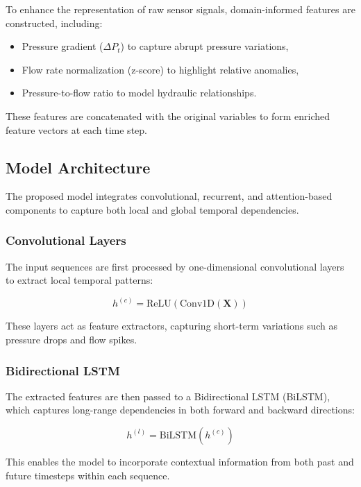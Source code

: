 To enhance the representation of raw sensor signals, domain-informed features
are constructed, including:

\begin{itemize}
    \item Pressure gradient ($\Delta P_t$) to capture abrupt pressure variations,
    \item Flow rate normalization (z-score) to highlight relative anomalies,
    \item Pressure-to-flow ratio to model hydraulic relationships.
\end{itemize}

These features are concatenated with the original variables to form enriched
feature vectors at each time step.

\subsection{Model Architecture}

The proposed model integrates convolutional, recurrent, and attention-based
components to capture both local and global temporal dependencies.

\subsubsection{Convolutional Layers}

The input sequences are first processed by one-dimensional convolutional layers
to extract local temporal patterns:

\begin{equation}
h^{(c)} = \text{ReLU}(\text{Conv1D}(\mathbf{X}))
\end{equation}

These layers act as feature extractors, capturing short-term variations such as
pressure drops and flow spikes.

\subsubsection{Bidirectional LSTM}

The extracted features are then passed to a Bidirectional LSTM (BiLSTM), which
captures long-range dependencies in both forward and backward directions:

\begin{equation}
h^{(l)} = \text{BiLSTM}(h^{(c)})
\end{equation}

This enables the model to incorporate contextual information from both past and
future timesteps within each sequence.

